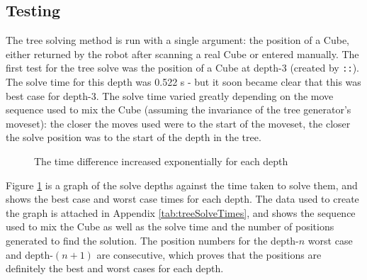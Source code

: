 \documentclass{report}
\newcommand{\movesequencenospace}[1]{\uppercase{\texttt{:\formatmovesnospace{#1}:}}}
\newcommand{\depth}[1]{depth-#1}
\begin{document}
    \subsection{Testing}

	The tree solving method is run with a single argument: the position of a Cube, either returned by the robot after scanning a real Cube or entered manually. The first test for the tree solve was the position of a Cube at \depth{3} (created by \movesequencenospace{l'd'u'}). The solve time for this depth was 0.522 \si{\second} - but it soon became clear that this was best case for \depth{3}. The solve time varied greatly depending on the move sequence used to mix the Cube (assuming the invariance of the tree generator's moveset): the closer the moves used were to the start of the moveset, the closer the solve position was to the start of the depth in the tree.
    
   	\begin{figure}[H]
    	\begin{center}
    		\caption{The time difference increased exponentially for each depth}
    		\label{fig:treeSolveGraph}
    	\end{center}
    \end{figure}
    
    Figure \ref{fig:treeSolveGraph} is a graph of the solve depths against the time taken to solve them, and shows the best case and worst case times for each depth. The data used to create the graph is attached in Appendix \ref{tab:treeSolveTimes}, and shows the sequence used to mix the Cube as well as the solve time and the number of positions generated to find the solution. The position numbers for the \depth{$n$} worst case and \depth{$(n+1)$} are consecutive, which proves that the positions are definitely the best and worst cases for each depth.
    
\end{document}
